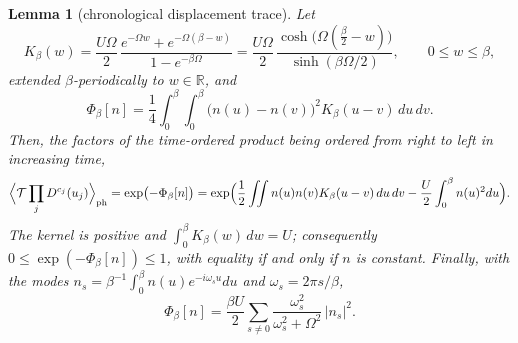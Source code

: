 \documentclass[11pt]{article}
\theoremstyle{plain}
\newtheorem{lemma}{Lemma}
\theoremstyle{definition}
\begin{document}
\begin{lemma}[chronological displacement trace]\label{lem:chronological}
Let
\begin{equation}\label{eq:kernel}
K_\beta(w)=\frac{U\Omega}{2}\,\frac{e^{-\Omega w}+e^{-\Omega(\beta-w)}}{1-e^{-\beta\Omega}}
=\frac{U\Omega}{2}\,\frac{\cosh\bigl(\Omega(\tfrac{\beta}{2}-w)\bigr)}{\sinh(\beta\Omega/2)},
\qquad 0\le w\le\beta,
\end{equation}
extended $\beta$-periodically to $w\in\mathbb{R}$, and
\begin{equation}\label{eq:phip}
\Phi_\beta[n]=\frac14\int_0^\beta\!\!\int_0^\beta\bigl(n(u)-n(v)\bigr)^2
K_\beta(u-v)\,du\,dv .
\end{equation}
Then, the factors of the time-ordered product being ordered from right to left in
increasing time,
\begin{equation}\label{eq:chronological}
\Bigl\langle\mathcal{T}\prod_{j}D^{c_j}(u_j)\Bigr\rangle_{\mathrm{ph}}
=\exp\bigl(-\Phi_\beta[n]\bigr)
=\exp\Bigl(\frac12\iint n(u)n(v)K_\beta(u-v)\,du\,dv-\frac{U}{2}\int_0^\beta n(u)^2du\Bigr).
\end{equation}
The kernel is positive and $\int_0^\beta K_\beta(w)\,dw=U$; consequently
$0\le\exp(-\Phi_\beta[n])\le1$, with equality if and only if $n$ is constant.
Finally, with the modes $n_s=\beta^{-1}\int_0^\beta n(u)e^{-i\omega_su}du$ and
$\omega_s=2\pi s/\beta$,
\begin{equation}\label{eq:phimode}
\Phi_\beta[n]=\frac{\beta U}{2}\sum_{s\ne0}
\frac{\omega_s^{2}}{\omega_s^{2}+\Omega^{2}}\,|n_s|^{2}.
\end{equation}
\end{lemma}
\end{document}
